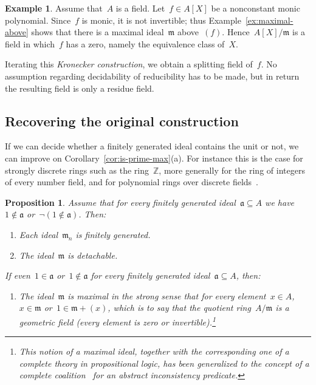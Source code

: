 \documentclass[com,11pt,crcready]{iosart2x}
\theoremstyle{definition}
\newtheorem{example}[definition]{Example}
\theoremstyle{plain}
\newtheorem{proposition}[definition]{Proposition}
\theoremstyle{remark}
\newcommand{\?}{\,{:}\,}
\newcommand{\aaa}{\mathfrak{a}}
\newcommand{\mmm}{\mathfrak{m}}
\newcommand{\ZZ}{\mathbb{Z}}
\renewcommand{\_}{\mathpunct{.}\,}
\begin{document}
\begin{example}Assume that~$A$ is a field. Let~$f \in A[X]$ be a nonconstant monic
polynomial. Since~$f$ is monic, it is not invertible; thus
Example~\ref{ex:maximal-above} shows that there is a maximal ideal~$\mmm$
above~$(f)$. Hence~$A[X]/\mmm$ is a field in which~$f$ has a zero, namely the equivalence class of~$X$.

Iterating this \emph{Kronecker construction}, we obtain a splitting field of~$f$. No
assumption regarding decidability of reducibility has to be made, but in return
the resulting field is only a residue field.\end{example}


\subsection{Recovering the original construction}

If we can decide whether a finitely generated ideal contains the
unit or not, we can improve on Corollary~\ref{cor:is-prime-max}(a). For instance this is the case for
strongly discrete rings such as the ring~$\ZZ$, more generally for the ring of
integers of every number field, and for polynomial rings over discrete
fields~\cite[Theorem~VIII.1.5]{mines-richman-ruitenburg:constructive-algebra}.

\begin{proposition}\label{prop:with-test}
Assume that for every finitely generated ideal~$\aaa \subseteq A$ we have~$1
\not\in \aaa$ or~$\neg(1 \not\in \aaa)$. Then:
\begin{enumerate}
\item[\textnormal{(a)}] Each ideal~$\mmm_n$ is finitely generated.
\item[\textnormal{(b)}] The ideal~$\mmm$ is detachable.
\end{enumerate}
If even~$1 \in \aaa$ or~$1 \not\in \aaa$ for every finitely generated ideal~$\aaa \subseteq
A$, then:
\begin{enumerate}
\addtocounter{enumi}{2}
\item[\textnormal{(c)}] The ideal~$\mmm$ is maximal in the strong sense that for every element~$x
\in A$,~$x \in \mmm$ or~$1 \in \mmm + (x)$, which is to say that the quotient ring~$A/\mmm$ is a
\emph{geometric field} (every element is zero or invertible).\footnote{This
notion of a maximal ideal, together with the corresponding one of a complete
theory in propositional logic, has been generalized to the concept of a
complete coalition~\cite{schuster-wessel:cie2020,schuster-wessel:jacincpred} for an abstract inconsistency
predicate.}
\end{enumerate}
\end{proposition}
\end{document}
